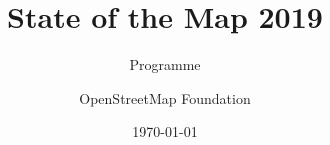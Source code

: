 \documentclass[
version=last,toc=bib,toc=graduated,toc=index,toc=listof,fontsize=9pt,openany]{scrbook}
\title{State of the Map 2019}
\subtitle{Programme}
\author{OpenStreetMap Foundation}
\date{\today}
\begin{document}
 
\begin{titlepage}
  \null
\end{titlepage}
\pagestyle{cropmarksstyle}



%
%






%



%
\end{document}
